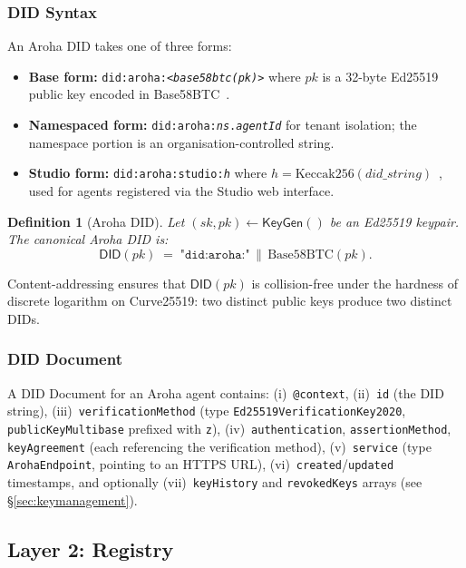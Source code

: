 \documentclass[conference]{IEEEtran}
\newtheorem{definition}{Definition}
\newcommand{\KeyGen}{\mathsf{KeyGen}}
\newcommand{\DID}{\mathsf{DID}}
\begin{document}
\subsubsection{DID Syntax}

An Aroha DID takes one of three forms:

\begin{itemize}
  \item \textbf{Base form:}
    \texttt{did:aroha:\textit{<base58btc(pk)>}} where $pk$ is a
    32-byte Ed25519 public key encoded in Base58BTC~\cite{w3c2021multibase}.
  \item \textbf{Namespaced form:}
    \texttt{did:aroha:\textit{ns}.\textit{agentId}} for tenant
    isolation; the namespace portion is an organisation-controlled
    string.
  \item \textbf{Studio form:}
    \texttt{did:aroha:studio:\textit{h}} where $h =
    \mathrm{Keccak256}(\mathit{did\_string})$~\cite{keccak2015},
    used for agents registered via the Studio web interface.
\end{itemize}

\begin{definition}[Aroha DID]
Let $(\mathit{sk}, pk) \leftarrow \KeyGen()$ be an Ed25519
keypair. The canonical Aroha DID is:
\[
  \DID(pk) \;=\;
  \texttt{"did:aroha:"} \,\|\, \mathrm{Base58BTC}(pk).
\]
\end{definition}

Content-addressing ensures that $\DID(pk)$ is collision-free
under the hardness of discrete logarithm on Curve25519: two
distinct public keys produce two distinct DIDs.

\subsubsection{DID Document}

A DID Document for an Aroha agent contains:
(i)~\texttt{@context},
(ii)~\texttt{id} (the DID string),
(iii)~\texttt{verificationMethod} (type
\texttt{Ed25519VerificationKey2020}, \texttt{publicKeyMultibase}
prefixed with \texttt{z}),
(iv)~\texttt{authentication}, \texttt{assertionMethod},
\texttt{keyAgreement} (each referencing the verification method),
(v)~\texttt{service} (type \texttt{ArohaEndpoint}, pointing to
an HTTPS URL),
(vi)~\texttt{created}/\texttt{updated} timestamps, and
optionally (vii)~\texttt{keyHistory} and
\texttt{revokedKeys} arrays (see \S\ref{sec:keymanagement}).

\subsection{Layer 2: Registry}
\label{sec:l2}
\end{document}
